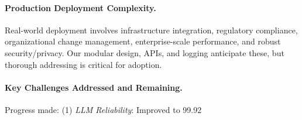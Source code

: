 \documentclass[manuscript,screen,9pt]{acmart}
\begin{document}
\paragraph{Production Deployment Complexity.} Real-world deployment involves infrastructure integration, regulatory compliance, organizational change management, enterprise-scale performance, and robust security/privacy. Our modular design, APIs, and logging anticipate these, but thorough addressing is critical for adoption.

\paragraph{Key Challenges Addressed and Remaining.}
Progress made: (1) \textit{LLM Reliability}: Improved to 99.92%
\end{document}
